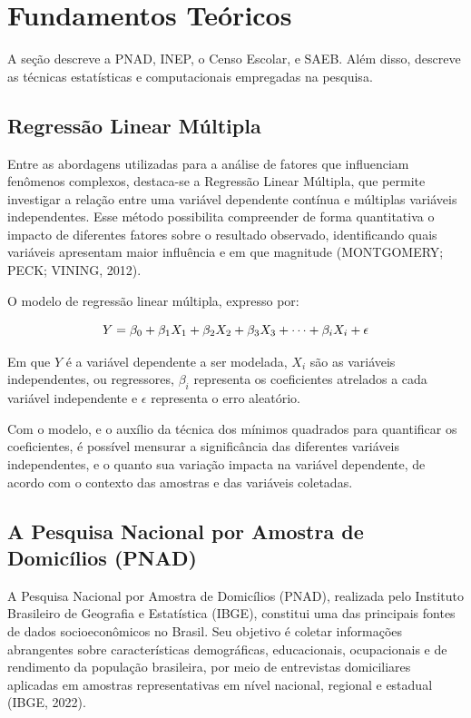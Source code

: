 \documentclass[english, spanish, brazilian]{RBIEarticle} %
\begin{document}
\section{Fundamentos Teóricos}
A seção descreve a PNAD, INEP, o Censo Escolar, e SAEB. Além disso, descreve as técnicas estatísticas e computacionais empregadas na pesquisa.




\subsection{Regressão Linear Múltipla}
Entre as abordagens utilizadas para a análise de fatores que influenciam fenômenos complexos, destaca-se a Regressão Linear Múltipla, que permite investigar a relação entre uma variável dependente contínua e múltiplas variáveis independentes. Esse método possibilita compreender de forma quantitativa o impacto de diferentes fatores sobre o resultado observado, identificando quais variáveis apresentam maior influência e em que magnitude (MONTGOMERY; PECK; VINING, 2012).

O modelo de regressão linear múltipla, expresso por:

\vspace{0.5cm}
\begin{equation}
\large Y = \beta_0 + \beta_1X_1 + \beta_2X_2 + \beta_3X_3 + \cdots + \beta_iX_i + \epsilon 
\end{equation}
\vspace{0.5cm}

Em que $Y$ é a variável dependente a ser modelada, $X_i$ são as variáveis independentes, ou regressores, $\beta_i$ representa os coeficientes atrelados a cada variável independente e $\epsilon$ representa o erro aleatório. 

Com o modelo, e o auxílio da técnica dos mínimos quadrados para quantificar os coeficientes, é possível mensurar a significância das diferentes variáveis independentes, e o quanto sua variação impacta na variável dependente, de acordo com o contexto das amostras e das variáveis coletadas.


\subsection{A Pesquisa Nacional por Amostra de Domicílios (PNAD)}
A Pesquisa Nacional por Amostra de Domicílios (PNAD), realizada pelo Instituto Brasileiro de Geografia e Estatística (IBGE), constitui uma das principais fontes de dados socioeconômicos no Brasil. Seu objetivo é coletar informações abrangentes sobre características demográficas, educacionais, ocupacionais e de rendimento da população brasileira, por meio de entrevistas domiciliares aplicadas em amostras representativas em nível nacional, regional e estadual (IBGE, 2022).
\end{document}
